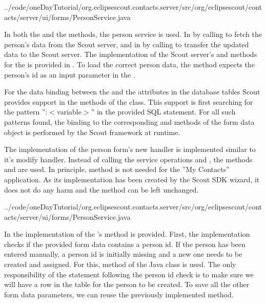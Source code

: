 \documentclass[a4paper,10pt,twoside]{book}
\begin{document}

{../code/oneDayTutorial/org.eclipsescout.contacts.server/src/org/eclipsescout/contacts/server/ui/forms/PersonService.java}

In both the  and the  methods, the person service is used. 
In  by calling  to fetch the person's data from the Scout server, and in  by calling  to transfer the updated data to the Scout server. 
The implementation of the Scout server's  and  methods for the  is provided in . 
To load the correct person data, the  method expects the person's id as an input parameter  in the . 

For the data binding between the  and the attributes in the database tables Scout provides support in the methods of the  class.
This support is first searching for the pattern '':$<$variable$>$'' in the provided SQL statement. 
For all such patterns found, the binding to the corresponding  and  methods of the form data object is performed by the Scout framework at runtime. 

The implementation of the person form's new handler is implemented similar to it's modify handler. 
Instead of calling the service operations  and , the methods   and  are used. 
In principle, method  is not needed for the ''My Contacts'' application. 
As its implementation has been created by the Scout SDK wizard, it does not do any harm and the method can be left unchanged. 


{../code/oneDayTutorial/org.eclipsescout.contacts.server/src/org/eclipsescout/contacts/server/ui/forms/PersonService.java}

In  the implementation of the 's  method is provided. 
First, the implementation checks if the provided form data contains a person id. 
If the person has been entered manually, a person id is initially missing and a new one needs to be created and assigned. 
For this, method  of the Java class  is used. 
The only responsibility of the  statement following the person id check is to make sure we will have a row in the  table for the person to be created. 
To save all the other form data parameters, we can reuse the previously implemented  method. 
\end{document}
